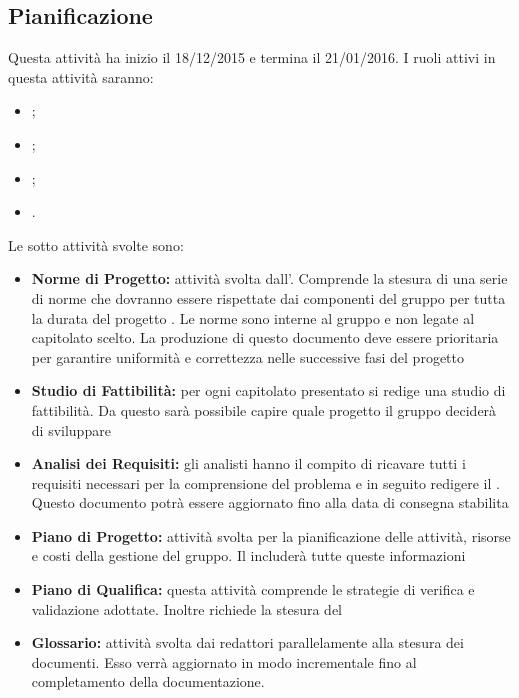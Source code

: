 \documentclass[12pt,a4paper]{article}
\begin{document}
\subsection{Pianificazione} %
Questa attività ha inizio il 18/12/2015 e termina il 21/01/2016. I ruoli attivi in questa attività saranno:
\begin{itemize}
	\item \PM;
	\item \AM;
	\item \AN;
	\item \VR.
\end{itemize}
Le sotto attività svolte sono:
\begin{itemize}
	\item \textbf{Norme di Progetto:} attività svolta dall’\AM. Comprende la stesura di una serie di norme che dovranno essere rispettate dai componenti del gruppo per tutta la durata del progetto \prjL. Le norme sono interne al gruppo e non legate al capitolato scelto. La produzione di questo documento deve essere prioritaria per garantire uniformità e correttezza nelle successive fasi del progetto
	\item \textbf{Studio di Fattibilità:} per ogni capitolato presentato si redige una studio di fattibilità. Da questo sarà possibile capire quale progetto il gruppo deciderà di sviluppare
	\item \textbf{Analisi dei Requisiti:} gli analisti hanno il compito di ricavare tutti i requisiti necessari per la comprensione del problema e in seguito redigere il \AdR. Questo documento potrà essere aggiornato fino alla data di consegna stabilita
	\item \textbf{Piano di Progetto:} attività svolta per la pianificazione delle attività, risorse e costi della gestione del gruppo. Il \PdP{} includerà tutte queste informazioni
	\item \textbf{Piano di Qualifica:} questa attività comprende le strategie di verifica e validazione adottate. Inoltre richiede la stesura del \PdQ
	\item \textbf{Glossario:} attività svolta dai redattori parallelamente alla stesura dei documenti. Esso verrà aggiornato in modo incrementale fino al completamento della documentazione.
\end{itemize}
\end{document}

